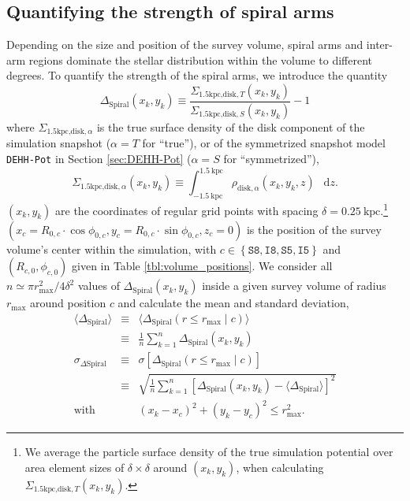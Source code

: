 \documentclass[iop,revtex4,numberedappendix,appendixfloats]{emulateapj}
\newcommand*\diff{\mathop{}\!\mathrm{d}}
\begin{document}
\subsection{Quantifying the strength of spiral arms} \label{sec:spiral_arm_DeltaS}

Depending on the size and position of the survey volume, spiral arms and inter-arm regions dominate the stellar distribution within the volume to different degrees. To quantify the strength of the spiral arms, we introduce the quantity
\begin{equation}
\Delta_\text{Spiral} (x_k,y_k) \equiv \frac{\Sigma_{\text{1.5kpc,disk},T}(x_k,y_k)}{\Sigma_{\text{1.5kpc,disk},S}(x_k,y_k)} -1\label{eq:DeltaS_definition}
\end{equation}
where $\Sigma_{\text{1.5kpc,disk},\alpha}$ is the true surface density of the disk component of the simulation snapshot ($\alpha=T$ for ``true''), or of the symmetrized snapshot model \texttt{DEHH-Pot} in Section \ref{sec:DEHH-Pot} ($\alpha=S$ for ``symmetrized''),
\begin{equation}
\Sigma_{\text{1.5kpc,disk},\alpha}(x_k,y_k) \equiv \int_{-1.5~\text{kpc}}^{1.5~\text{kpc}} \rho_{\text{disk},\alpha}(x_k,y_k,z) \ \diff z.
\end{equation}
$(x_k,y_k)$ are the coordinates of regular grid points with spacing $\delta=0.25~\text{kpc}$.\footnote{We average the particle surface density of the true simulation potential over area element sizes of $\delta \times \delta$ around $(x_k,y_k)$, when calculating $\Sigma_{\text{1.5kpc,disk},T}(x_k,y_k)$.} $(x_c=R_{0,c} \cdot \cos \phi_{0,c},y_c=R_{0,c} \cdot \sin \phi_{0,c},z_c=0)$ is the position of the survey volume's center within the simulation, with $c\in\left\{ \texttt{S8},\texttt{I8},\texttt{S5},\texttt{I5}\right\}$ and $(R_{c,0},\phi_{c,0})$ given in Table \ref{tbl:volume_positions}. We consider all $n \simeq \pi r_\text{max}^2/4\delta^2$ values of $\Delta_\text{Spiral} (x_k,y_k)$ inside a given survey volume of radius $r_\text{max}$ around position $c$ and calculate the mean and standard deviation,
\begin{eqnarray}
\langle \Delta_\text{Spiral} \rangle &\equiv& \langle \Delta_\text{Spiral} (r \leq r_\text{max} \mid c) \rangle \nonumber\\
&\equiv & \frac 1n \sum_{k=1}^n \Delta_\text{Spiral}(x_k,y_k)\label{eq:mean_DeltaS}\\
\sigma_{\Delta\text{Spiral}} &\equiv& \sigma[\Delta_\text{Spiral}(r \leq r_\text{max} \mid c)]  \nonumber\\
&\equiv &  \sqrt{\frac 1n \sum_{k=1}^{n} \left[ \Delta_\text{Spiral}(x_k,y_k) -  \langle \Delta_\text{Spiral} \rangle \right]^2}\label{eq:std_DeltaS}\\
 \text{with } && (x_k-x_c)^2 + (y_k-y_c)^2 \leq r_\text{max}^2.
\end{eqnarray}
\end{document}
